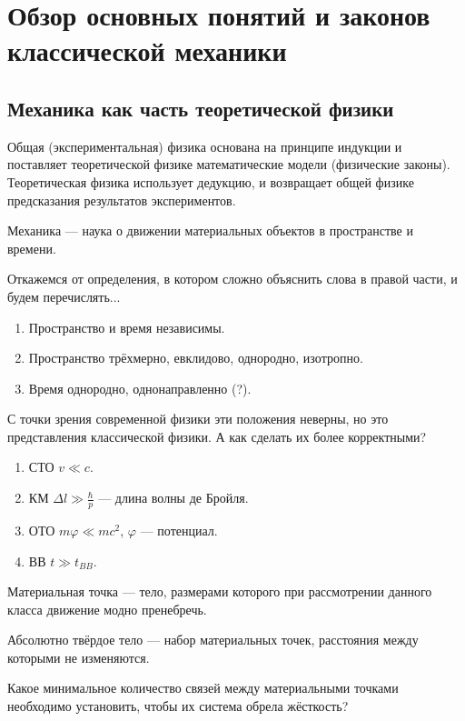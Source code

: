 \section{Обзор основных понятий и законов классической механики}
\subsection{Механика как часть теоретической физики}
Общая (экспериментальная) физика основана на принципе индукции и поставляет теоретической физике математические модели (физические законы). Теоретическая физика использует дедукцию, и возвращает общей физике предсказания результатов экспериментов.

\begin{dfn} Механика --- наука о движении материальных объектов в пространстве и времени. \end{dfn}
Откажемся от определения, в котором сложно объяснить слова в правой части, и будем перечислять...
\begin{enumerate}
\item Пространство и время независимы.
\item Пространство трёхмерно, евклидово, однородно, изотропно.
\item Время однородно, однонаправленно (?).
\end{enumerate}
С точки зрения современной физики эти положения неверны, но это представления классической физики. А как сделать их более корректными?
\begin{enumerate}
\item СТО $v \ll c$.
\item КМ $\Delta l \gg \frac{\hbar}{p}$ --- длина волны де Бройля.
\item ОТО $m \varphi \ll mc^2$, $\varphi$ --- потенциал.
\item ВВ $t \gg t_{BB}$.
\end{enumerate}

\begin{dfn}
Материальная точка --- тело, размерами которого при рассмотрении данного класса движение модно пренебречь.
\end{dfn}
\begin{dfn}
Абсолютно твёрдое тело --- набор материальных точек, расстояния между которыми не изменяются.
\end{dfn}

\begin{task} Какое минимальное количество связей между материальными точками необходимо установить, чтобы их система обрела жёсткость? \end{task}

